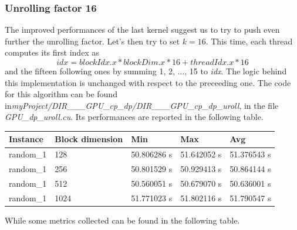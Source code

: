 \documentclass[12pt]{extarticle}
\begin{document}
\subsubsection{Unrolling factor 16}
The improved performances of the last kernel suggest us to try to push even further the unrolling factor. Let's then try to set $k=16$. This time, each thread computes its first index as
\[idx = blockIdx.x * blockDim.x * 16 + threadIdx.x * 16 \]
and the fifteen following ones by summing 1, 2, $\dots$, 15 to \emph{idx}. The logic behind this implementation is unchanged with respect to the preceeding one.\newline
The code for this algorithm can be found in\newline \emph{myProject/DIR\_\_\_GPU\_cp\_dp/DIR\_\_\_GPU\_cp\_dp\_uroll}, in the file \emph{GPU\_dp\_uroll.cu}.\newline
Its performances are reported in the following table.
\begin{center}
\begin{tabular}{ | m{2.2cm} | m{3.2cm} | m{2.2cm} | m{2.2cm} | m{2.2cm} |}
 \hline
 Instance & Block dimension & Min & Max & Avg\\
 \hline
 random\_1 & 128 & 50.806286 s & 51.642052 s & 51.376543 s\\
 \hline
 random\_1 & 256 & 50.801529 s & 50.929413 s & 50.864144 s\\
 \hline
 random\_1 & 512 & 50.560051 s & 50.679070 s & 50.636001 s\\
 \hline
 random\_1 & 1024 & 51.771023 s & 51.802116 s & 51.790547 s\\
 \hline
 \end{tabular}
 \end{center}
 While some metrics collected can be found in the following table.
\begin{center}
\noindent%
\end{center}
\end{document}
